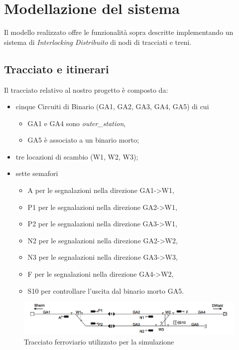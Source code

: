 \chapter{Modellazione del sistema}
\label{cap:modelling}
Il modello realizzato offre le funzionalità sopra descritte implementando un
sistema di \textit{Interlocking Distribuito} di nodi di tracciati e treni.
\section{Tracciato e itinerari}
Il tracciato relativo al nostro progetto è composto da:
\begin{itemize}
  \item cinque Circuiti di Binario (GA1, GA2, GA3, GA4, GA5) di cui 
  \begin{itemize}
    \item GA1 e GA4 sono \textit{outer\_station},
    \item GA5 è associato a un binario morto;
	\end{itemize}
	\item tre locazioni di scambio (W1, W2, W3);
	\item sette semafori
	\begin{itemize}
	  \item A per le segnalazioni nella direzione GA1-\textgreater W1,
	  \item P1 per le segnalazioni nella direzione GA2-\textgreater W1,
	  \item P2 per le segnalazioni nella direzione GA3-\textgreater W1,
	  \item N2 per le segnalazioni nella direzione GA2-\textgreater W2,
	  \item N3 per le segnalazioni nella direzione GA3-\textgreater W3,
	  \item F per le segnalazioni nella direzione GA4-\textgreater W2,
	  \item S10 per controllare l'uscita dal binario morto GA5.
	 \end{itemize} 
\end{itemize}

\begin{figure}
\includegraphics[width=13.5cm]{imgs/reteInterlocking.png}
\caption{Tracciato ferroviario utilizzato per la simulazione}\label{fig:X}
\end{figure}



